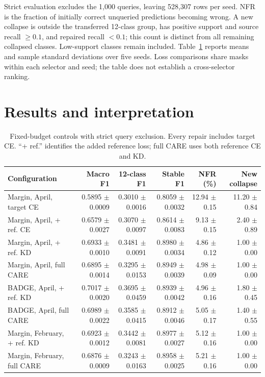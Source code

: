 \documentclass[11pt]{article}
\begin{document}
Strict evaluation excludes the 1{,}000 queries, leaving 528{,}307 rows per seed. NFR is the fraction of initially correct unqueried predictions becoming wrong. A new collapse is outside the transferred 12-class group, has positive support and source recall $\geq0.1$, and repaired recall $<0.1$; this count is distinct from all remaining collapsed classes. Low-support classes remain included. Table~\ref{tab:controls} reports means and sample standard deviations over five seeds. Loss comparisons share masks within each selector and seed; the table does not establish a cross-selector ranking.

\section{Results and interpretation}
\begin{table}[!htbp]\centering\small
\caption{Fixed-budget controls with strict query exclusion. Every repair includes target CE. ``+ ref.'' identifies the added reference loss; full CARE uses both reference CE and KD.}
\label{tab:controls}
\setlength{\tabcolsep}{2.5pt}
\begin{tabular}{@{}lrrrrr@{}}\toprule
Configuration & Macro F1 & 12-class F1 & Stable F1 & NFR (\%) & New collapse\\\midrule
Margin, April, target CE & 0.5895 $\pm$ 0.0009 & 0.3010 $\pm$ 0.0016 & 0.8059 $\pm$ 0.0032 & 12.94 $\pm$ 0.15 & 11.20 $\pm$ 0.84 \\
Margin, April, + ref. CE & 0.6579 $\pm$ 0.0027 & 0.3070 $\pm$ 0.0097 & 0.8614 $\pm$ 0.0083 & 9.13 $\pm$ 0.15 & 2.40 $\pm$ 0.89 \\
Margin, April, + ref. KD & 0.6933 $\pm$ 0.0010 & 0.3481 $\pm$ 0.0091 & 0.8980 $\pm$ 0.0034 & 4.86 $\pm$ 0.12 & 1.00 $\pm$ 0.00 \\
Margin, April, full CARE & 0.6895 $\pm$ 0.0014 & 0.3295 $\pm$ 0.0153 & 0.8949 $\pm$ 0.0039 & 4.98 $\pm$ 0.09 & 1.00 $\pm$ 0.00 \\
BADGE, April, + ref. KD & 0.7017 $\pm$ 0.0020 & 0.3695 $\pm$ 0.0459 & 0.8939 $\pm$ 0.0042 & 4.96 $\pm$ 0.16 & 1.80 $\pm$ 0.45 \\
BADGE, April, full CARE & 0.6989 $\pm$ 0.0022 & 0.3585 $\pm$ 0.0415 & 0.8912 $\pm$ 0.0046 & 5.05 $\pm$ 0.17 & 1.40 $\pm$ 0.55 \\
Margin, February, + ref. KD & 0.6923 $\pm$ 0.0012 & 0.3442 $\pm$ 0.0081 & 0.8977 $\pm$ 0.0027 & 5.12 $\pm$ 0.16 & 1.00 $\pm$ 0.00 \\
Margin, February, full CARE & 0.6876 $\pm$ 0.0009 & 0.3243 $\pm$ 0.0163 & 0.8958 $\pm$ 0.0025 & 5.21 $\pm$ 0.16 & 1.00 $\pm$ 0.00 \\
\bottomrule\end{tabular}
\end{table}
\end{document}
